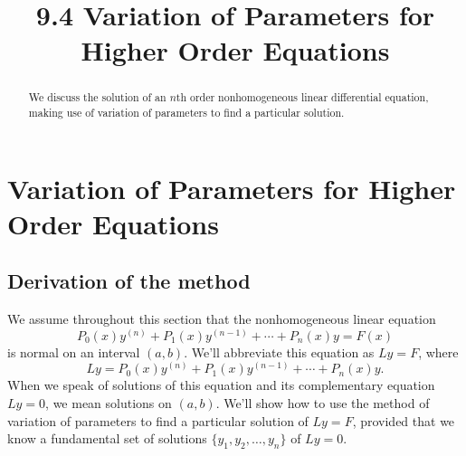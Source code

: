 \documentclass{ximera}
\title{9.4 Variation of Parameters for Higher Order Equations}%
\begin{document}
\begin{abstract}
We discuss the solution of an $n$th order nonhomogeneous linear differential equation, making use of variation of parameters to find a particular solution.
\end{abstract}

\maketitle

\section*{Variation of Parameters for Higher Order Equations}

\subsection*{Derivation of the method}

We assume throughout this section that the nonhomogeneous linear equation
\begin{equation} \label{eq:9.4.1}
P_0(x)y^{(n)}+P_1(x)y^{(n-1)}+\cdots+P_n(x)y=F(x)
\end{equation}
is normal on an interval $(a,b)$. We'll abbreviate this equation as
$Ly=F$, where
$$
Ly=P_0(x)y^{(n)}+P_1(x)y^{(n-1)}+\cdots+P_n(x)y.
$$
When we speak of solutions of this equation and its complementary
equation $Ly=0$, we mean solutions on $(a,b)$. We'll show how to use
the method of variation of parameters to find a particular solution of
$Ly=F$, provided that we know a fundamental set of solutions
$\{y_1,y_2,\dots,y_n\}$ of $Ly=0$.
\end{document}
